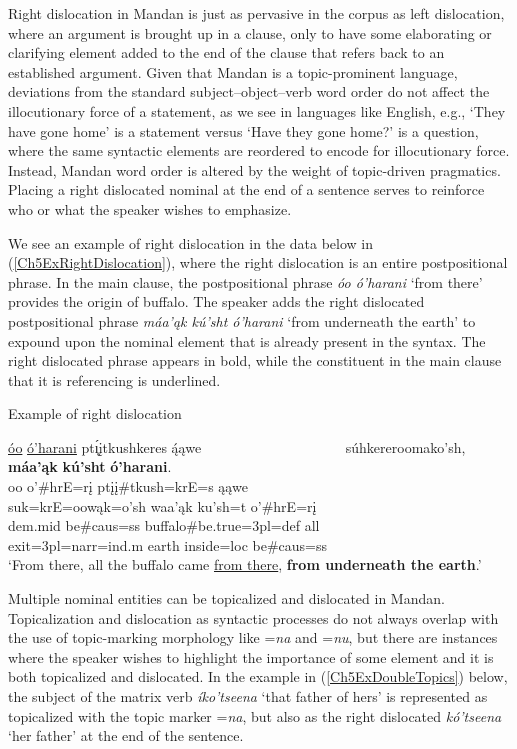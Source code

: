 Right dislocation in Mandan is just as pervasive in the corpus as left dislocation, where an argument is brought up in a clause, only to have some elaborating or clarifying element added to the end of the clause that refers back to an established argument. Given that Mandan is a topic-prominent language, deviations from the standard subject--object--verb word order do not affect the illocutionary force of a statement, as we see in languages like English, e.g., `They have gone home' is a statement versus `Have they gone home?' is a question, where the same syntactic elements are reordered to encode for illocutionary force. Instead, Mandan word order is altered by the weight of topic-driven pragmatics. Placing a right dislocated nominal at the end of a sentence serves to reinforce who or what the speaker wishes to emphasize. 

We see an example of right dislocation in the data below in (\ref{Ch5ExRightDislocation}), where the right dislocation is an entire postpositional phrase. In the main clause, the postpositional phrase \textit{óo ó'harani} `from there' provides the origin of buffalo. The speaker adds the right dislocated postpositional phrase \textit{máa'ąk kú'sht ó'harani} `from underneath the earth' to expound upon the nominal element that is already present in the syntax. The right dislocated phrase appears in bold, while the constituent in the main clause that it is referencing is underlined.

\begin{exe}
    \item\label{Ch5ExRightDislocation} Example of right dislocation

            \glll \uline{óo} \uline{ó'harani} pt\'{ı̨}įtkushkeres ą́ąwe  ~ ~ ~ ~ ~ ~  ~ ~ ~ ~ ~ ~ súhkereroomako'sh, \textbf{máa'ąk} \textbf{kú'sht} \textbf{ó'harani}.\\
        oo o'\#hrE=rį ptįį\#tkush=krE=s ąąwe  ~ ~ ~ ~ ~ ~  ~ ~ ~ ~ ~ ~ suk=krE=oowąk=o'sh waa'ąk ku'sh=t o'\#hrE=rį\\
        dem.mid \textnormal{be}\#caus=ss \textnormal{buffalo}\#\textnormal{be.true}=3pl=def \textnormal{all}  ~ ~ ~ ~ ~ ~  ~ ~ ~ ~ ~ ~ \textnormal{exit}=3pl=narr=ind.m \textnormal{earth} \textnormal{inside}=loc \textnormal{be}\#caus=ss\\
        \glt `From there, all the buffalo came \uline{from there}, \textbf{from underneath the earth}.' \citep[114]{hollow1973b}
\end{exe}

Multiple nominal entities can be topicalized and dislocated in Mandan. Topicalization and dislocation as syntactic processes do not always overlap with the use of topic-marking morphology like =\textit{na} and =\textit{nu}, but there are instances where the speaker wishes to highlight the importance of some element and it is both topicalized and dislocated. In the example in (\ref{Ch5ExDoubleTopics}) below, the subject of the matrix verb \textit{íko'tseena} `that father of hers' is represented as topicalized with the topic marker =\textit{na}, but also as the right dislocated \textit{kó'tseena} `her father' at the end of the sentence.

